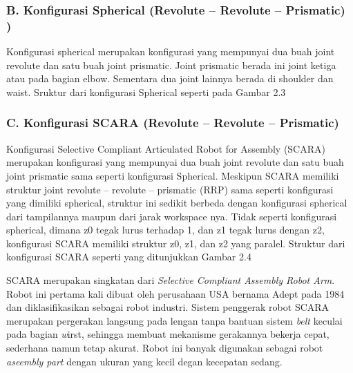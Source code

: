 \subsubsection{B. Konfigurasi Spherical (Revolute – Revolute – Prismatic)   )} 

Konfigurasi spherical merupakan konfigurasi yang mempunyai dua buah joint revolute dan satu buah joint prismatic. Joint prismatic berada ini joint ketiga atau pada bagian elbow. Sementara dua joint lainnya berada di shoulder dan waist. Sruktur dari konfigurasi Spherical seperti pada Gambar 2.3

\subsubsection{C. Konfigurasi SCARA (Revolute – Revolute – Prismatic) } 

Konfigurasi Selective Compliant Articulated Robot for Assembly (SCARA) merupakan konfigurasi yang mempunyai dua buah joint revolute dan satu buah joint prismatic sama seperti konfigurasi Spherical. Meskipun SCARA memiliki struktur joint revolute – revolute – prismatic (RRP) sama seperti konfigurasi yang dimiliki spherical, struktur ini sedikit berbeda dengan konfigurasi spherical dari tampilannya maupun dari jarak workspace nya. Tidak seperti konfigurasi spherical, dimana z0 tegak lurus terhadap 1, dan z1 tegak lurus dengan z2, konfigurasi SCARA memiliki struktur z0, z1, dan z2 yang paralel. Struktur dari konfigurasi SCARA seperti yang ditunjukkan Gambar 2.4

SCARA merupakan singkatan dari \emph{Selective Compliant Assembly Robot Arm}. Robot ini pertama kali dibuat oleh perusahaan USA bernama Adept pada 1984 dan diklasifikasikan sebagai robot industri. Sistem penggerak robot SCARA merupakan pergerakan langsung pada lengan tanpa bantuan sistem \emph{belt} keculai pada bagian \emph wirst, sehingga membuat mekanisme gerakannya bekerja cepat, sederhana namun tetap akurat. Robot ini banyak digunakan sebagai robot \emph {aseembly part} dengan ukuran yang kecil degan kecepatan sedang. 

